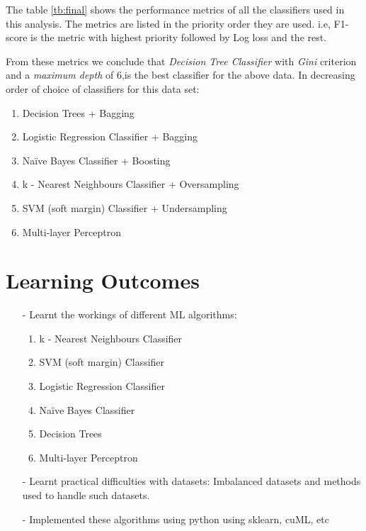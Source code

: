 \documentclass[letterpaper, 11 pt, conference]{ieeeconf}  %
\begin{document}
The table \ref{tb:final} shows the performance metrics of all the classifiers used in this analysis.
The metrics are listed in the priority order they are used. i.e, F1-score is the metric with highest priority followed by Log loss and the rest.

From these metrics we conclude that \textit{Decision Tree Classifier} with \textit{Gini} criterion and a \textit{maximum depth} of $6$,is the best classifier for the above data. 
In decreasing order of choice of classifiers for this data set:

\begin{enumerate}
	\item Decision Trees + Bagging
	\item Logistic Regression Classifier + Bagging
	\item Na\"ive Bayes Classifier + Boosting
	\item k - Nearest Neighbours Classifier + Oversampling
	\item SVM (soft margin) Classifier + Undersampling



	\item Multi-layer Perceptron
\end{enumerate}

\section*{Learning Outcomes}
\begin{itemize}
     \item[-] Learnt the workings of different ML algorithms:
     	\begin{enumerate}
     		\item k - Nearest Neighbours Classifier
     		\item SVM (soft margin) Classifier
     		\item Logistic Regression Classifier
     		\item Na\"ive Bayes Classifier
     		\item Decision Trees
     		\item Multi-layer Perceptron
     	\end{enumerate}
     \item[-] Learnt practical difficulties with datasets: Imbalanced datasets and methods used to handle such datasets.
     \item[-] Implemented these algorithms using python using sklearn, cuML, etc
\end{itemize}
\end{document}
